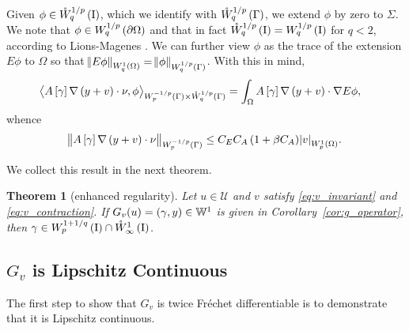 \documentclass[final]{siamltex}
\newtheorem{thm}[theorem]{Theorem}
\begin{document}
Given $\phi \in {{\mathring{W}^{{1/p}}_{{q}}\del{{\text{\rm I}}}}}$, which we identify with 
${{\mathring{W}^{{1/p}}_{{q}}\del{{\Gamma}}}}$, we extend $\phi$
by zero to $\Sigma$. We note that $\phi\in{{W^{{1/p}}_{{q}}\del{{\partial\Omega}}}}$
and that in fact ${{\mathring{W}^{{1/p}}_{{q}}\del{{\text{\rm I}}}}} = {{W^{{1/p}}_{{q}}\del{\text{\rm I}}}}$ for $q < 2$,
according to Lions-Magenes \cite[Th\'eor\`em 3.1]{JLLions_EMagenes_1961c}.
We can further view $\phi$ as the trace of the extension $E\phi$ to
$\Omega$ so
that ${\norm{{E\phi}}_{{W^{{1}}_{{q}}\del{{\Omega}}}}} = {\norm{{\phi}}_{{W^{{{1/p}}}_{{{q}}}\del{{{\Gamma}}}}}}$. With this in mind, 
\begin{align*}
	{{\mathop{{\left\langle {{A\sbr{\gamma}{\nabla}\del{y+v}\cdot\nu, \phi}} \right\rangle}}}_{{{W^{{-{1/p}}}_{{{p}}}\del{{{\Gamma}}}}}\times{{\mathring{W}^{{{1/p}}}_{{{q}}}\del{{{\Gamma}}}}}}} 
		&= \int_\Omega A\sbr{\gamma}{\nabla}\del{y+v}\cdot{\nabla}{E\phi},
\end{align*}
whence
	\begin{align*}
		{\norm{{A\sbr{\gamma}{\nabla}\del{y+v}\cdot\nu}}_{{W^{{{-1/p}}}_{{p}}\del{{\Gamma}}}}} \leq C_EC_A\del{1+\beta C_A}{\abs{{v}}_{{W^{{1}}_{{p}}\del{{\Omega}}}}}.
	\end{align*}

We collect this result in the next theorem.

\begin{thm}[enhanced regularity]\label{thm:g_interpolation} 
Let $u\in {\mathcal{U}}$ and $v$ satisfy \eqref{eq:v_invariant} 
and \eqref{eq:v_contraction}. 
If $G_v(u) = \del{\gamma, y} \in {\mathbb{W}}^1 $ is given in
Corollary~\ref{cor:g_operator}, then $\gamma \in {{W^{{1+1/q}}_{{p}}\del{\text{\rm I}}}}
\cap {{\mathring{W}^{{1}}_{{\infty}}\del{{\text{\rm I}}}}}$.
\end{thm}

\subsection{$G_v$ is Lipschitz Continuous}
\label{s:g_lipschitz}
The first step to show that $G_v$ is twice Fr\'echet differentiable is to demonstrate that it is Lipschitz continuous.
\end{document}

